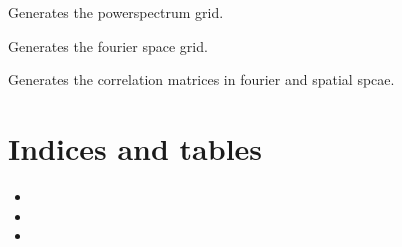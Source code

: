 \documentclass[letterpaper,10pt,english]{sphinxmanual}
\begin{document}
\begin{fulllineitems}
\begin{fulllineitems}
\label{\detokenize{gaussClass:gaussClass.GaussianRandomField.PowerSpectrum_grid_generator}}
\sphinxAtStartPar
Generates the powerspectrum grid.

\end{fulllineitems}


\begin{fulllineitems}
\label{\detokenize{gaussClass:gaussClass.GaussianRandomField.fourier_space_ind}}
\sphinxAtStartPar
Generates the fourier space grid.

\end{fulllineitems}


\begin{fulllineitems}
\label{\detokenize{gaussClass:gaussClass.GaussianRandomField.gen_correlation}}
\sphinxAtStartPar
Generates the correlation matrices in fourier and spatial spcae.

\end{fulllineitems}


\end{fulllineitems}



\chapter{Indices and tables}
\label{\detokenize{index:indices-and-tables}}\begin{itemize}
\item {} 
\sphinxAtStartPar
{}

\item {} 
\sphinxAtStartPar
{}

\item {} 
\sphinxAtStartPar
{}

\end{itemize}
\end{document}
